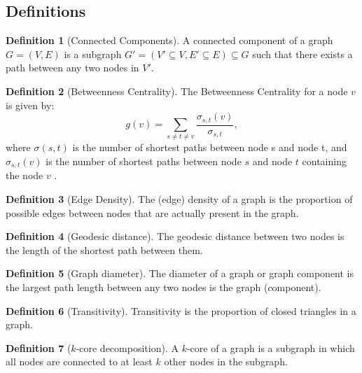 \documentclass{article}
\theoremstyle{definition}
\newtheorem{definition}{Definition}[section]
\begin{document}
\subsection{Definitions}
\begin{definition}[Connected Components]
A connected component of a graph $G=(V,E)$ is a subgraph $G'=(V' \subseteq V,E' \subseteq E)\subseteq G$ such that there exists a path between any two nodes in $V'$.
\end{definition}
\begin{definition}[Betweenness Centrality]
The Betweenness Centrality for a node $v$ is given by: $$g(v)=\sum_{s\neq t\neq v}\frac{\sigma_{s,t}(v)}{\sigma_{s,t}},$$ where $\sigma(s,t)$ is  the number of shortest paths between node s and node t, and  $\sigma_{s,t}(v)$ is the number of shortest paths between node $s$ and node $t$ containing the node $v$ \cite{barabasi_network_2016}.
\end{definition}
\begin{definition}[Edge Density]
The (edge) density of a graph is the proportion of possible edges between nodes
that are actually present in the graph.
\end{definition}
\begin{definition}[Geodesic distance]
The geodesic distance between two nodes is the length of the shortest path between them.
\end{definition}
\begin{definition}[Graph diameter]
The diameter of a graph or graph component is the largest path length between any two nodes is the graph (component).
\end{definition}
\begin{definition}[Transitivity]
Transitivity is the proportion of closed triangles in a graph.
\end{definition}
\begin{definition}[$k$-core decomposition]
A $k$-core of a graph is a subgraph in which all nodes are connected to at least $k$ other nodes in the subgraph.
\end{definition}
\end{document}
